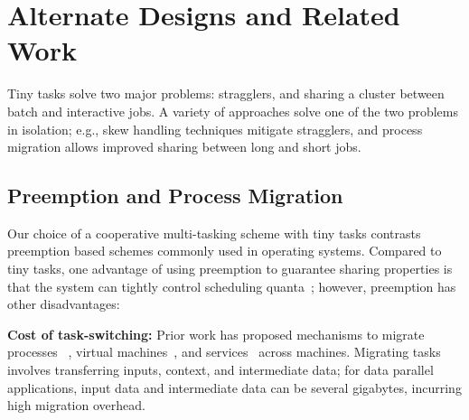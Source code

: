 \section{Alternate Designs and Related Work}
\label{sec:alternate}

Tiny tasks solve two major problems: stragglers, and sharing
a cluster between batch and interactive jobs. A variety of
approaches solve one of the two problems in isolation; e.g., skew handling
techniques mitigate stragglers, and process migration allows improved
sharing between long and short jobs.

\subsection{Preemption and Process Migration}
\label{sec:preemption}

Our choice of a cooperative multi-tasking scheme with tiny tasks 
contrasts preemption based schemes commonly used 
in operating systems.
Compared to tiny tasks, one advantage of using preemption to guarantee sharing
properties is that the system
can tightly control scheduling quanta~\cite{sherman1972trace,tanenbaum1990experiences};
however, preemption has other disadvantages:

\vspace{4pt}\noindent\textbf{Cost of task-switching:}
Prior work has proposed mechanisms to migrate processes
~\cite{douglis1991transparent,milojivcic2000process}, virtual machines~\cite{clark2005live}, and services~\cite{rozier1991overview} across machines.
Migrating tasks involves transferring inputs, context, and intermediate
data; for data parallel applications, input data and intermediate
data can be several gigabytes, incurring high migration overhead.

